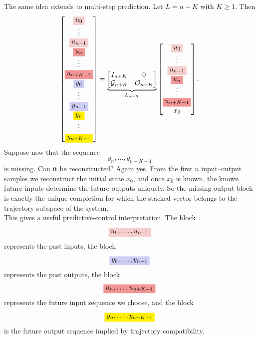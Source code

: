The same idea extends to multi-step prediction. Let $L=n+K$ with $K\geq 1$. Then
\[
\begin{bmatrix}
\colorbox{lightred}{$\displaystyle u_0$}\\
\vdots\\
\colorbox{lightred}{$\displaystyle u_{n-1}$}\\
\colorbox{midred}{$\displaystyle u_n$}\\
\vdots\\
\colorbox{midred}{$\displaystyle u_{n+K-1}$}\\
\colorbox{lightblue}{$\displaystyle y_0$}\\
\vdots\\
\colorbox{lightblue}{$\displaystyle y_{n-1}$}\\
\colorbox{yellowblock}{$\displaystyle y_n$}\\
\vdots\\
\colorbox{yellowblock}{$\displaystyle y_{n+K-1}$}
\end{bmatrix}
=
\underbrace{
\begin{bmatrix}
I_{n+K} & 0\\
\mathcal{G}_{n+K} & \mathcal{O}_{n+K}
\end{bmatrix}}_{\Lambda_{n+K}}
\begin{bmatrix}
\colorbox{lightred}{$\displaystyle u_0$}\\
\vdots\\
\colorbox{lightred}{$\displaystyle u_{n-1}$}\\
\colorbox{midred}{$\displaystyle u_n$}\\
\vdots\\
\colorbox{midred}{$\displaystyle u_{n+K-1}$}\\
x_0
\end{bmatrix}.
\]
Suppose now that the sequence
\[
y_n,\dots,y_{n+K-1}
\]
is missing. Can it be reconstructed? Again yes. From the first $n$ input--output samples we reconstruct the initial state $x_0$, and once $x_0$ is known, the known future inputs determine the future outputs uniquely. So the missing output block is exactly the unique completion for which the stacked vector belongs to the trajectory subspace of the system.\\
This gives a useful predictive-control interpretation. The block
\[
\colorbox{lightred}{$\displaystyle u_0,\dots,u_{n-1}$}
\]
represents the past inputs, the block
\[
\colorbox{lightblue}{$\displaystyle y_0,\dots,y_{n-1}$}
\]
represents the past outputs, the block
\[
\colorbox{midred}{$\displaystyle u_n,\dots,u_{n+K-1}$}
\]
represents the future input sequence we choose, and the block
\[
\colorbox{yellowblock}{$\displaystyle y_n,\dots,y_{n+K-1}$}
\]
is the future output sequence implied by trajectory compatibility.\\
